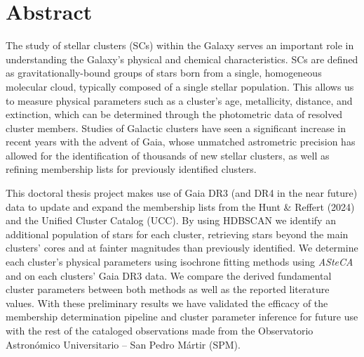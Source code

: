 \section*{Abstract}
The study of stellar clusters (SCs) within the Galaxy serves an important role in understanding the Galaxy’s physical and chemical characteristics. SCs are defined as gravitationally-bound groups of stars born from a single, homogeneous molecular cloud, typically composed of a single stellar population. This allows us to measure physical parameters such as a cluster’s age, metallicity, distance, and extinction, which can be determined through the photometric data of resolved cluster members. Studies of Galactic clusters have seen a significant increase in recent years with the advent of Gaia, whose unmatched astrometric precision has allowed for the identification of thousands of new stellar clusters, as well as refining membership lists for previously identified clusters.

This doctoral thesis project makes use of Gaia DR3 (and DR4 in the near future) data to update and expand the membership lists from the Hunt \& Reffert (2024) and the Unified Cluster Catalog (UCC). By using HDBSCAN we identify an additional population of stars for each cluster, retrieving stars beyond the main clusters’ cores and at fainter magnitudes than previously identified. We determine each cluster’s physical parameters using isochrone fitting methods using \textit{ASteCA} and  on each clusters' Gaia DR3 data. We compare the derived fundamental cluster parameters between both methods as well as the reported literature values. With these preliminary results we have validated the efficacy of the membership determination pipeline and cluster parameter inference for future use with the rest of the cataloged observations made from the Observatorio Astronómico Universitario -- San Pedro Mártir (SPM).





